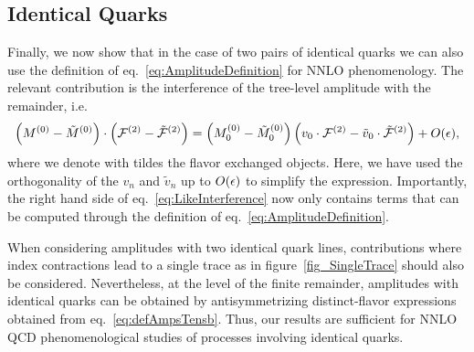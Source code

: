 \subsection{Identical Quarks}
Finally, we now show that in the case of two pairs of
identical quarks we can also use the
definition of eq.~\eqref{eq:AmplitudeDefinition} 
for NNLO phenomenology.
The relevant contribution is the interference of the 
tree-level amplitude with the remainder, i.e.\ \begin{equation}
  \left(M^{(0)} - \tilde{M}^{(0)}\right) \cdot \left( \mathcal{F}^{(2)} - \tilde{\mathcal{F}}^{(2)}\right)
  =
  \left(M^{(0)}_0 - \tilde{M}^{(0)}_0 \right) \left( v_0\cdot \mathcal{F}^{(2)} - \tilde{v}_0\cdot \tilde{\mathcal{F}}^{(2)}\right) + O(\epsilon),
  \label{eq:LikeInterference}
\end{equation}
where we denote with tildes the flavor exchanged objects.  Here, we
have used the orthogonality of the $v_n$ and $\tilde{v}_n$ up to
$O(\epsilon)$ to simplify the expression. Importantly, the right hand side
of eq.~\eqref{eq:LikeInterference} now only contains terms that can be
computed through the definition of 
eq.~\eqref{eq:AmplitudeDefinition}.


When considering amplitudes with two identical quark lines, contributions where
index contractions lead to a single trace as in figure~\ref{fig_SingleTrace} 
should also be considered. Nevertheless, at the level of the
finite remainder, amplitudes with identical quarks can be obtained by
antisymmetrizing distinct-flavor
expressions~\cite{DeFreitas:2004kmi,Abreu:2018jgq} obtained from
eq.~\eqref{eq:defAmpsTensb}. Thus, our results are sufficient for 
NNLO QCD phenomenological studies of processes involving 
identical quarks.

